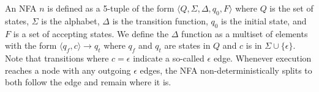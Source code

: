 An NFA $n$ is defined as a 5-tuple of the form
$\langle Q, \Sigma, \Delta, q_0, F \rangle$ where $Q$ is the
set of states, $\Sigma$ is the alphabet, $\Delta$ is the transition
function, $q_0$ is the initial state, and $F$ is a set of accepting
states. We define the $\Delta$ function as a multiset of elements
with the form $\langle q_f, c \rangle \rightarrow q_t$ where
$q_f$ and $q_t$ are states in $Q$ and $c$ is in
$\Sigma \cup \{ \epsilon \}$. Note that transitions where $c = \epsilon$
indicate a so-called $\epsilon$ edge. Whenever execution reaches a
node with any outgoing $\epsilon$ edges, the NFA non-deterministically
splits to both follow the edge and remain where it is.
